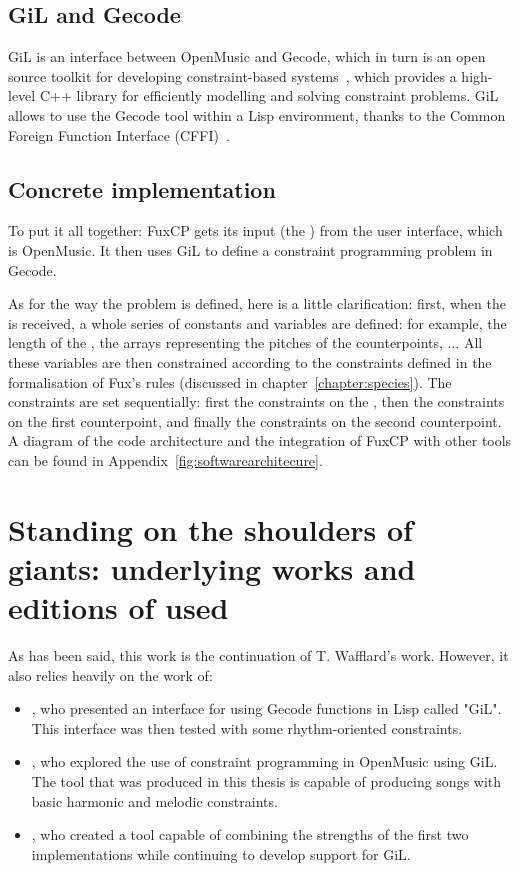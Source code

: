 \subsection{GiL and Gecode}
GiL is an interface between OpenMusic and Gecode, which in turn is an open source toolkit for developing constraint-based systems~\cite{Gecode}, which provides a high-level C++ library for efficiently modelling and solving constraint problems. GiL allows to use the Gecode tool within a Lisp environment, thanks to the Common Foreign Function Interface (CFFI)~\cite{CFFI}.

\subsection{Concrete implementation}
To put it all together: FuxCP gets its input (the \cf) from the user interface, which is OpenMusic. It then uses GiL to define a constraint programming problem in Gecode.

As for the way the problem is defined, here is a little clarification: first, when the \cfs is received, a whole series of constants and variables are defined: for example, the length of the \cf, the arrays representing the pitches of the counterpoints, ...
All these variables are then constrained according to the constraints defined in the formalisation of Fux's rules (discussed in chapter~\ref{chapter:species}). The constraints are set sequentially: first the constraints on the \cf, then the constraints on the first counterpoint, and finally the constraints on the second counterpoint. A diagram of the code architecture and the integration of FuxCP with other tools can be found in Appendix~\ref{fig:softwarearchitecure}.



\section{Standing on the shoulders of giants: underlying works and editions of \gaps used}
As has been said, this work is the continuation of T. Wafflard's work. However, it also relies heavily on the work of:
\begin{itemize}
    \item \textcite{GiLthesis}, who presented an interface for using Gecode functions in Lisp called "GiL". This interface was then tested with some rhythm-oriented constraints.
    \item \textcite{Melothesis}, who explored the use of constraint programming in OpenMusic using GiL. The tool that was produced in this thesis is capable of producing songs with basic harmonic and melodic constraints.
    \item \textcite{Melo2thesis}, who created a tool capable of combining the strengths of the first two implementations while continuing to develop support for GiL.
\end{itemize}

